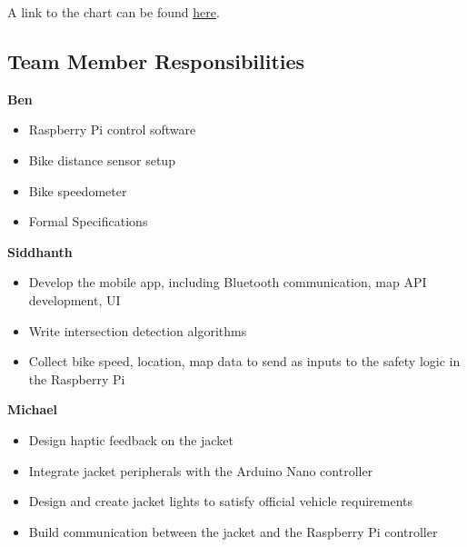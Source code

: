 \documentclass[journal]{IEEEtran}
\begin{document}
A link to the chart can be found \href{https://prod.teamgantt.com/gantt/schedule/?ids=1489092&public_keys=7aQHatcI23su&zoom=d100&font_size=12&estimated_hours=0&assigned_resources=0&percent_complete=0&documents=0&comments=0&col_width=355&hide_header_tabs=0&menu_view=1&resource_filter=1&name_in_bar=0&name_next_to_bar=0&resource_names=1#user=&company=&custom=&date_filter=&hide_completed=false&color_filter=}{\underline{here}}.

\subsection{Team Member Responsibilities}
\textbf{Ben}
\begin{itemize}
    \item Raspberry Pi control software
    \item Bike distance sensor setup
    \item Bike speedometer
    \item Formal Specifications
\end{itemize}

\textbf{Siddhanth}
\begin{itemize}
    \item Develop the mobile app, including Bluetooth communication, map API development, UI
    \item Write intersection detection algorithms
    \item Collect bike speed, location, map data to send as inputs to the safety logic in the Raspberry Pi
\end{itemize}

\textbf{Michael}
\begin{itemize}
    \item Design haptic feedback on the jacket
    \item Integrate jacket peripherals with the Arduino Nano controller
    \item Design and create jacket lights to satisfy official vehicle
requirements     \item Build communication between the jacket and the Raspberry Pi controller
\end{itemize}
\end{document}
